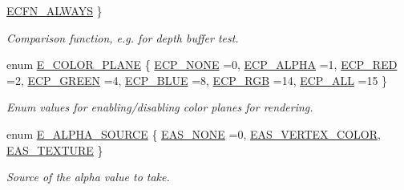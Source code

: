 \begin{DoxyCompactItemize}
\hyperlink{namespaceirr_1_1video_af5f3986e1d1be0f8d9aca55130ff5878a8d14ef9c1e84519f2b16a6d8c19ae56d}{E\+C\+F\+N\+\_\+\+A\+L\+W\+A\+YS}
 \}\begin{DoxyCompactList}\small\item\em Comparison function, e.\+g. for depth buffer test. \end{DoxyCompactList}
\item 
enum \hyperlink{namespaceirr_1_1video_aa9f25191ae536c1a4b08ec5334866a21}{E\+\_\+\+C\+O\+L\+O\+R\+\_\+\+P\+L\+A\+NE} \{ \newline
\hyperlink{namespaceirr_1_1video_aa9f25191ae536c1a4b08ec5334866a21aa5afe366b19c967f884d0bd4ca083df9}{E\+C\+P\+\_\+\+N\+O\+NE} =0, 
\hyperlink{namespaceirr_1_1video_aa9f25191ae536c1a4b08ec5334866a21ad345f3072dec27d31bedb82f1f3011a7}{E\+C\+P\+\_\+\+A\+L\+P\+HA} =1, 
\hyperlink{namespaceirr_1_1video_aa9f25191ae536c1a4b08ec5334866a21a36263a436337ff10be86fc9b5ae2f6d0}{E\+C\+P\+\_\+\+R\+ED} =2, 
\hyperlink{namespaceirr_1_1video_aa9f25191ae536c1a4b08ec5334866a21a1e712fd8781a461da6f0a293a3e7180f}{E\+C\+P\+\_\+\+G\+R\+E\+EN} =4, 
\newline
\hyperlink{namespaceirr_1_1video_aa9f25191ae536c1a4b08ec5334866a21a31e270dab7c29a6e642ac491b172d16d}{E\+C\+P\+\_\+\+B\+L\+UE} =8, 
\hyperlink{namespaceirr_1_1video_aa9f25191ae536c1a4b08ec5334866a21a41d3738a2d0a4c67fa01148b05ee3fc6}{E\+C\+P\+\_\+\+R\+GB} =14, 
\hyperlink{namespaceirr_1_1video_aa9f25191ae536c1a4b08ec5334866a21a674ec773096b1b504b38ed78213e1e38}{E\+C\+P\+\_\+\+A\+LL} =15
 \}\begin{DoxyCompactList}\small\item\em Enum values for enabling/disabling color planes for rendering. \end{DoxyCompactList}
\item 
enum \hyperlink{namespaceirr_1_1video_a08b237bb445ffc0f32932c8ed87c6e63}{E\+\_\+\+A\+L\+P\+H\+A\+\_\+\+S\+O\+U\+R\+CE} \{ \hyperlink{namespaceirr_1_1video_a08b237bb445ffc0f32932c8ed87c6e63a3989589d4fc8dd35d634b3a05e3db936}{E\+A\+S\+\_\+\+N\+O\+NE} =0, 
\hyperlink{namespaceirr_1_1video_a08b237bb445ffc0f32932c8ed87c6e63a83768b0c4d47856b13ed409b43822d1f}{E\+A\+S\+\_\+\+V\+E\+R\+T\+E\+X\+\_\+\+C\+O\+L\+OR}, 
\hyperlink{namespaceirr_1_1video_a08b237bb445ffc0f32932c8ed87c6e63ad57d5d09230cefbfc77681b6ec2c92fe}{E\+A\+S\+\_\+\+T\+E\+X\+T\+U\+RE}
 \}\begin{DoxyCompactList}\small\item\em Source of the alpha value to take. \end{DoxyCompactList}

\end{DoxyCompactItemize}

